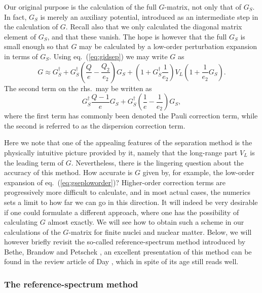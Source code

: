 Our original purpose is the calculation of the full $G$-matrix, not only
that of $G_S$. In fact, $G_S$ is merely an auxiliary potential,
introduced as an intermediate step in the calculation of $G$. Recall also
that we only calculated the diagonal matrix element of $G_S$, and that
these vanish. The hope is however that the full $G_S$ is small enough so
that $G$ may be calculated by a low-order perturbation expansion
in terms of $G_S$.
Using eq.\ (\ref{eq:gidsep}) we may write $G$ as
\begin{equation}
        G\approx G_S^{\dagger} +
        G_S^{\dagger}\left(\frac{Q}{e}-\frac{Q_2}{e_2}\right)G_S
        +\left(1+G_S^{\dagger}\frac{1}{e_2}\right)V_L
        \left(1+\frac{1}{e_2}G_S\right).
        \label{eq:gseploworder}
\end{equation}
The second term on the rhs.\ may be written as
\[
    G_S^{\dagger}\frac{Q-1}{e}G_S+
    G_S^{\dagger}\left(\frac{1}{e}-\frac{1}{e_2}\right)G_S,
\]
where the first term has commonly been denoted the Pauli correction term,
while the second is referred to as the dispersion correction term.

Here we note that one of the appealing features of the
separation method is the physically intuitive picture provided by it,
namely that the long-range part $V_L$ is the leading term of $G$.
Nevertheless, there is the lingering question about the accuracy
of this method. How accurate is $G$ given by, for example, the low-order
expansion of eq.\ (\ref{eq:gseploworder})?
Higher-order correction terms are progressively
more difficult to calculate, and in most actual cases, the numerics
sets a limit to how far we can go 
in this direction. It will indeed be very
desirable if one could formulate a different approach, where
one has the possibility of calculating $G$ almost exactly. We will see
how to obtain such a scheme in our calculations of the
$G$-matrix for finite nuclei and nuclear matter. Below, we will however
briefly revisit the so-called reference-spectrum method introduced
by Bethe, Brandow and Petschek \cite{bbp63}, an excellent
presentation of this method
can be found in the review article of Day \cite{day67}, which in spite of
its age still reads well.


\subsubsection{The reference-spectrum method}

